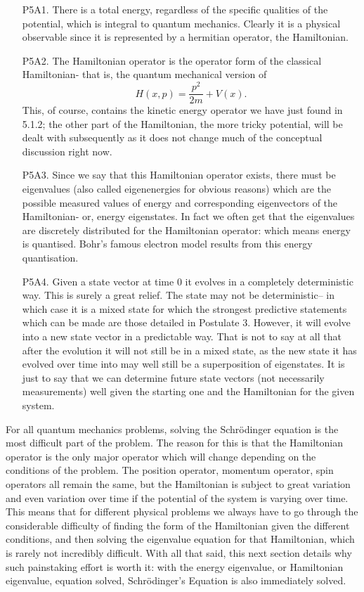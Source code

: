 \begin{enumerate}
    \item[P5A1.] There is a total energy, regardless of the specific qualities of the potential, which is integral to quantum mechanics. Clearly it is a physical observable since it is represented by a hermitian operator, the Hamiltonian.
    \item[P5A2.] The Hamiltonian operator is the operator form of the classical Hamiltonian- that is, the quantum mechanical version of 
    $$
    H(x,p)=\frac{p^2}{2m}+V(x).
    $$
    This, of course, contains the kinetic energy operator we have just found in 5.1.2; the other part of the Hamiltonian, the more tricky potential, will be dealt with subsequently as it does not change much of the conceptual discussion right now.
    \item[P5A3.] Since we say that this Hamiltonian operator exists, there must be eigenvalues (also called eigenenergies for obvious reasons) which are the possible measured values of energy and corresponding eigenvectors of the Hamiltonian- or, energy eigenstates. In fact we often get that the eigenvalues are discretely distributed for the Hamiltonian operator: which means energy is quantised. Bohr's famous electron model results from this energy quantisation.
    \item[P5A4.] Given a state vector at time $0$ it evolves in a completely deterministic way. This is surely a great relief. The state may not be deterministic-- in which case it is a mixed state for which the strongest predictive statements which can be made are those detailed in Postulate 3. However, it will evolve into a new state vector in a predictable way. That is not to say at all that after the evolution it will not still be in a mixed state, as the new state it has evolved over time into may well still be a superposition of eigenstates. It is just to say that we can determine future state vectors (not necessarily measurements) well given the starting one and the Hamiltonian for the given system.
\end{enumerate}
For all quantum mechanics problems, solving the Schr\"{o}dinger equation is the most difficult part of the problem. The reason for this is that the Hamiltonian operator is the only major operator which will change depending on the conditions of the problem. The position operator, momentum operator, spin operators all remain the same, but the Hamiltonian is subject to great variation and even variation over time if the potential of the system is varying over time. This means that for different physical problems we always have to go through the considerable difficulty of finding the form of the Hamiltonian given the different conditions, and then solving the eigenvalue equation for that Hamiltonian, which is rarely not incredibly difficult. With all that said, this next section details why such painstaking effort is worth it: with the energy eigenvalue, or Hamiltonian eigenvalue, equation solved, Schr\"{o}dinger's Equation is also immediately solved.
